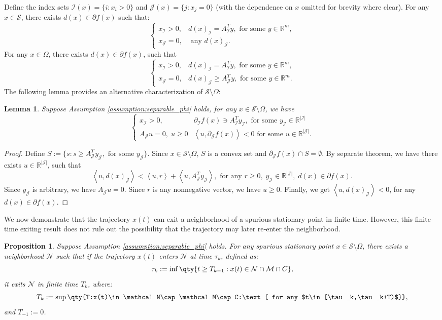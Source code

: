 \documentclass[11pt]{article}
\newcommand{\R}{\mathbb R}
\newcommand{\cI}{\mathcal I}
\newcommand{\cJ}{\mathcal J}
\newcommand{\cM}{\mathcal M}
\newcommand{\cN}{\mathcal N}
\newcommand{\cS}{\mathcal S}
\def\inner#1{\left\langle#1\right\rangle}
\newtheorem{lemma}{Lemma}[section]
\newtheorem{proposition}{Proposition}[section]
\begin{document}
Define the index sets $ \mathcal{I}(x) = \{ i : x_i > 0 \} $ and $ \mathcal{J}(x) = \{ j : x_j = 0 \} $ (with the dependence on $ x $ omitted for brevity where clear). For any $ x \in \mathcal{S} $, there exists $ d(x) \in \partial f(x) $ such that:
\[
\left\{\begin{array}{cc}
    x_{\cI}>0, &d(x)_\cI=A^T_{\cI}y, \text{ for some }y\in\R^m,\\
    x_{\cJ}=0, & \text{ any }d(x)_{\cJ}.
\end{array}\right.
\]
For any $x\in\Omega$, there exists $d(x)\in\partial f(x)$, such that 
\[
\left\{\begin{array}{cc}
    x_{\cI}>0, &d(x)_{\cI}=A^T_{\cI}y, \text{ for some }y\in\R^m,  \\
    x_{\cJ}=0, & d(x)_{\cJ}\geq A^T_{\cJ}y, \text{ for some }y\in\R^m.
\end{array}\right.
\]
The following lemma provides an alternative characterization of $ \mathcal{S} \setminus \Omega $:
\begin{lemma}
\label{le:alternative}
Suppose Assumption \ref{assumption:separable_phi} holds, for any $x\in\cS\setminus\Omega$, we have
\[
\left\{\begin{array}{cc}
    x_{\cI}>0, &\partial_{\cI}f(x)\ni A^T_{\cI}y_{\cI}, \text{ for some }y_{\cI}\in\R^{|\cI|}  \\
    A_{\cJ}u=0,\;u\geq0 & \inner{u,\partial_{\cJ}f(x)}<0\text{ for some }u\in\R^{|\cJ|} .
\end{array}\right.
\]
\end{lemma}
\begin{proof}
Define $S:=\{s:s\geq A^T_{\cJ}y_{\cJ}, \text{ for some }y_\cJ\}$. Since $x\in\cS\setminus\Omega$, $S$ is a convex set and $\partial_\cJ f(x)\cap S=\emptyset$. By separate theorem, we have there exists $u\in\R^{|\cJ|}$, such that
\[
\inner{u,d(x)_\cJ}<\inner{u,r}+\inner{u,A^T_\cJ y_\cJ}, \text{ for any }r\geq0,\;y_\cJ\in\R^{|\cJ|},\;d(x)\in\partial f(x).
\]
Since $y_\cJ$ is arbitrary, we have $A_\cJ u=0$. Since $r$ is any nonnegative vector, we have $u\geq0$. Finally, we get $\inner{u,d(x)_\cJ }<0$, for any $d(x)\in\partial f(x)$.
\end{proof}

We now demonstrate that the trajectory $ x(t) $ can exit a neighborhood of a spurious stationary point in finite time. However, this finite‐time exiting result does not rule out the possibility that the trajectory may later re‐enter the neighborhood.

\begin{proposition}
\label{prop:exiting}
Suppose Assumption \ref{assumption:separable_phi} holds. For any spurious stationary point $ x \in \mathcal{S} \setminus \Omega $, there exists a neighborhood $ \mathcal{N} $ such that if the trajectory $ x(t) $ enters $ \mathcal{N} $ at time $ \tau_k $, defined as:
\[\tau_k:=\inf\qty{t\geq T_{k-1}:x(t)\in\cN\cap\cM\cap C},
\]
it exits $ \mathcal{N} $ in finite time $ T_k $, where:
\[
T_k:=\sup\qty{T:x(t)\in\cN\cap\cM\cap C:\text{ for any $t\in[\tau_k,\tau_k+T)$}},
\]
and $T_{-1}:=0$.
\end{proposition}
\end{document}
